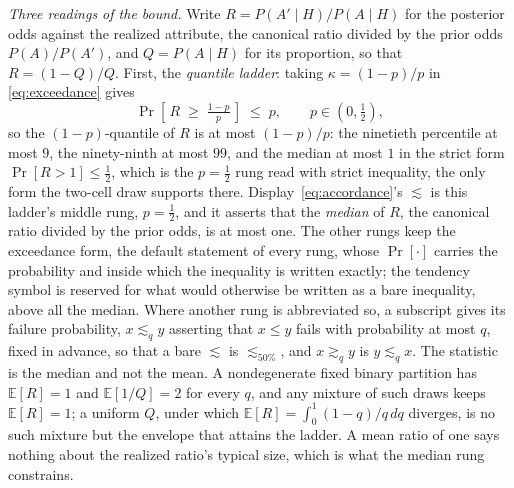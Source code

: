 \textit{Three readings of the bound.} Write $R = P(A' \mid H)/P(A \mid H)$ for the posterior odds against the realized attribute, the canonical ratio divided by the prior odds $P(A)/P(A')$, and $Q = P(A \mid H)$ for its proportion, so that $R = (1-Q)/Q$. First, the \emph{quantile ladder}: taking $\kappa = (1-p)/p$ in \eqref{eq:exceedance} gives
\begin{equation}
\label{eq:ladder}
\Pr\!\left[\, R \;\ge\; \tfrac{1-p}{p} \,\right] \;\le\; p, \qquad p \in (0, \tfrac12),
\end{equation}
so the $(1-p)$-quantile of $R$ is at most $(1-p)/p$: the ninetieth percentile at most $9$, the ninety-ninth at most $99$, and the median at most $1$ in the strict form $\Pr[R > 1] \le \tfrac12$, which is the $p = \tfrac12$ rung read with strict inequality, the only form the two-cell draw supports there. Display~\eqref{eq:accordance}'s $\lesssim$ is this ladder's middle rung, $p = \tfrac12$, and it asserts that the \emph{median} of $R$, the canonical ratio divided by the prior odds, is at most one. The other rungs keep the exceedance form, the default statement of every rung, whose $\Pr[\cdot]$ carries the probability and inside which the inequality is written exactly; the tendency symbol is reserved for what would otherwise be written as a bare inequality, above all the median. Where another rung is abbreviated so, a subscript gives its failure probability, $x \lesssim_q y$ asserting that $x \le y$ fails with probability at most $q$, fixed in advance, so that a bare $\lesssim$ is $\lesssim_{50\%}$, and $x \gtrsim_q y$ is $y \lesssim_q x$. The statistic is the median and not the mean. A nondegenerate fixed binary partition has $\mathbb{E}[R] = 1$ and $\mathbb{E}[1/Q] = 2$ for every $q$, and any mixture of such draws keeps $\mathbb{E}[R] = 1$; a uniform $Q$, under which $\mathbb{E}[R] = \int_0^1 (1-q)/q\,dq$ diverges, is no such mixture but the envelope that attains the ladder. A mean ratio of one says nothing about the realized ratio's typical size, which is what the median rung constrains.

